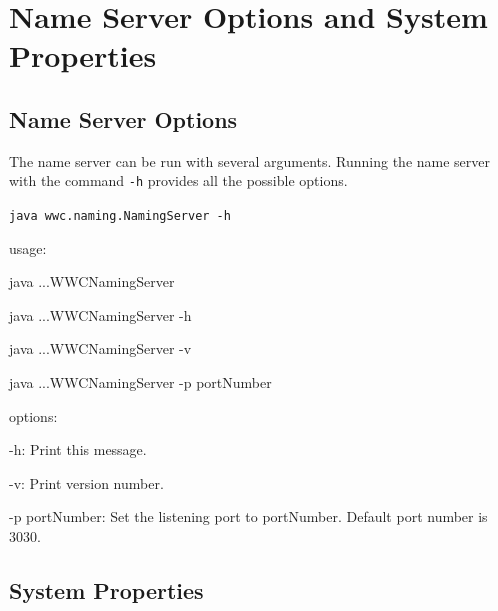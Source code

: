  
\appendix    %

\chapter{Name Server Options and System Properties}\label{nameserverop}
  \section{Name Server Options}
    The name server can be run with several arguments. Running the name server 
    with the command {\tt -h} provides all the possible options.\\
    {\tt java wwc.naming.NamingServer -h
	  \begin{description}
	  \item {usage:
		\begin{description}
		\item java ...WWCNamingServer
		\item java ...WWCNamingServer -h
		\item java ...WWCNamingServer -v
		\item java ...WWCNamingServer -p portNumber
		\end{description}
	  }
	  \item {options:
		\begin{description}
		\item -h: Print this message.
		\item -v: Print version number.
		\item -p portNumber: Set the listening port to portNumber. Default port number is $3030$.
		\end{description}                  
	  }
	  \end{description} 
	}

  \section{System Properties}
	
